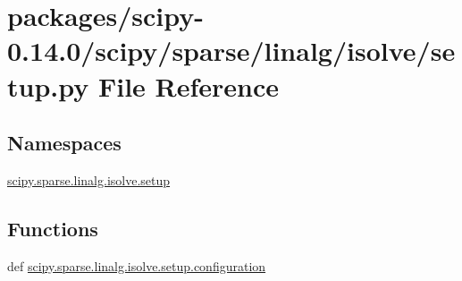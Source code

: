 \hypertarget{packages_2scipy-0_814_80_2scipy_2sparse_2linalg_2isolve_2setup_8py}{}\section{packages/scipy-\/0.14.0/scipy/sparse/linalg/isolve/setup.py File Reference}
\label{packages_2scipy-0_814_80_2scipy_2sparse_2linalg_2isolve_2setup_8py}
\subsection*{Namespaces}
\begin{DoxyCompactItemize}
\item 
 \hyperlink{namespacescipy_1_1sparse_1_1linalg_1_1isolve_1_1setup}{scipy.\+sparse.\+linalg.\+isolve.\+setup}
\end{DoxyCompactItemize}
\subsection*{Functions}
\begin{DoxyCompactItemize}
\item 
def \hyperlink{namespacescipy_1_1sparse_1_1linalg_1_1isolve_1_1setup_ac25d5c61c4cbd955d188e6889de5cd4b}{scipy.\+sparse.\+linalg.\+isolve.\+setup.\+configuration}
\end{DoxyCompactItemize}

